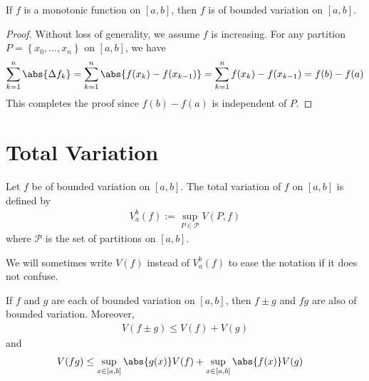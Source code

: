 \documentclass[thmcnt=section, 12pt]{elegantbook}
\begin{document}

\begin{theorem} \label{thm:29}
    If $f$ is a monotonic function on $[a, b]$, then $f$ is of bounded variation on $[a, b]$.
\end{theorem}

\begin{proof}
    Without loss of generality, we assume $f$ is increasing. For any partition $P = \left\{x_0, \ldots, x_n\right\}$ on $[a, b]$, we have 
    \begin{align*}
        \sum_{k=1}^n \abs{\Delta f_k}
        = \sum_{k=1}^n \abs{f(x_k) - f(x_{k-1})}
        = \sum_{k=1}^n f(x_k) - f(x_{k-1})
        = f(b) - f(a)
    \end{align*}
    This completes the proof since $f(b) - f(a)$ is independent of $P$.
\end{proof}


\section{Total Variation}


\begin{definition}
    Let $f$ be of bounded variation on $[a, b]$. The total variation of $f$ on $[a, b]$ is defined by 
    \begin{align*}
        V_a^b (f) 
        := \sup_{P \in \mathcal{P}} V(P, f) 
    \end{align*}
    where $\mathcal{P}$ is the set of partitions on $[a, b]$.
\end{definition}

\begin{remark}
    We will sometimes write $V(f)$ instead of $V_a^b (f)$ to ease the notation if it does not confuse.
\end{remark}


\begin{theorem} \label{thm:31}
    If $f$ and $g$ are each of bounded variation on $[a, b]$, then $f \pm g$ and $f g$ are also of bounded variation. Moreover, 
    \begin{align}
        V(f \pm g) \leq V(f) + V(g) 
        \label{eq:59}
    \end{align}
    and 
    \begin{align}
        V(f g) &\leq \sup_{x\in [a, b]} \abs{g(x)} V(f) + \sup_{x \in [a, b]} \abs{f(x)} V(g)
        \label{eq:60}
    \end{align}
\end{theorem}
\end{document}
